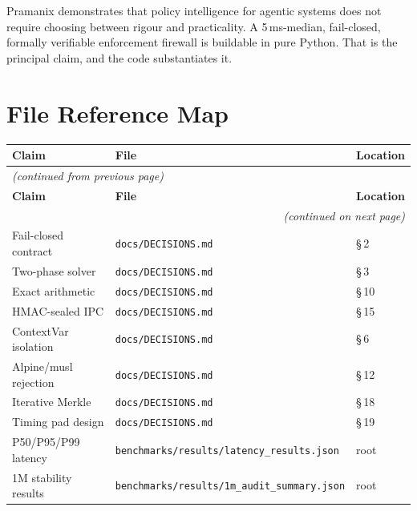 \documentclass[12pt,a4paper,oneside]{report}
\newcommand{\fname}[1]{\texttt{#1}}          %
\newcommand{\cfrsec}[1]{\S\,#1}             %
\begin{document}
Pramanix demonstrates that policy intelligence for agentic systems does not
require choosing between rigour and practicality.  A 5\,ms-median,
fail-closed, formally verifiable enforcement firewall is buildable in pure
Python.  That is the principal claim, and the code substantiates it.


\appendix

\chapter{File Reference Map}
\label{app:references}

\begin{longtable}{@{} p{5.5cm} p{5cm} p{3.5cm} @{}}
\toprule
\textbf{Claim} & \textbf{File} & \textbf{Location} \\
\midrule
\endfirsthead
\multicolumn{3}{l}{\footnotesize\textit{(continued from previous page)}} \\
\toprule
\textbf{Claim} & \textbf{File} & \textbf{Location} \\
\midrule
\endhead
\bottomrule
\multicolumn{3}{r}{\footnotesize\textit{(continued on next page)}} \\
\endfoot
\bottomrule
\endlastfoot
Fail-closed contract        & \fname{docs/DECISIONS.md}     & \cfrsec{2} \\
Two-phase solver            & \fname{docs/DECISIONS.md}     & \cfrsec{3} \\
Exact arithmetic            & \fname{docs/DECISIONS.md}     & \cfrsec{10} \\
HMAC-sealed IPC             & \fname{docs/DECISIONS.md}     & \cfrsec{15} \\
ContextVar isolation        & \fname{docs/DECISIONS.md}     & \cfrsec{6} \\
Alpine/musl rejection       & \fname{docs/DECISIONS.md}     & \cfrsec{12} \\
Iterative Merkle            & \fname{docs/DECISIONS.md}     & \cfrsec{18} \\
Timing pad design           & \fname{docs/DECISIONS.md}     & \cfrsec{19} \\
P50/P95/P99 latency         & \fname{benchmarks/results/latency\_results.json} & root \\
1M stability results        & \fname{benchmarks/results/1m\_audit\_summary.json} & root \\

\end{longtable}
\end{document}
